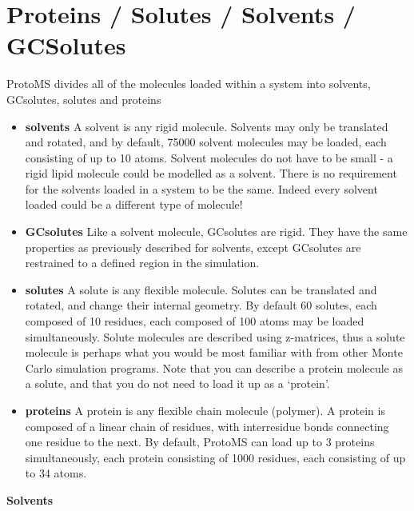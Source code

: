 \documentclass[letterpaper,10pt,english]{sphinxmanual}
\begin{document}
\section{Proteins / Solutes / Solvents / GCSolutes}
\label{protoms:proteins-solutes-solvents-gcsolutes}
ProtoMS divides all of the molecules loaded within a system into solvents, GCsolutes, solutes and proteins
\begin{itemize}
\item {} 
\textbf{solvents}  A solvent is any rigid molecule. Solvents may only be translated and rotated, and by default, 75000 solvent molecules may be loaded, each consisting of up to 10 atoms. Solvent molecules do not have to be small - a rigid lipid molecule could be modelled as a solvent. There is no requirement for the solvents loaded in a system to be the same. Indeed every solvent loaded could be a different type of molecule!

\item {} 
\textbf{GCsolutes} Like a solvent molecule, GCsolutes are rigid. They have the same properties as previously described for solvents, except GCsolutes are restrained to a defined region in the simulation.

\item {} 
\textbf{solutes} A solute is any flexible molecule. Solutes can be translated and rotated, and change their internal geometry. By default 60 solutes, each composed of 10 residues, each composed of 100 atoms may be loaded simultaneously. Solute molecules are described using z-matrices, thus a solute molecule is perhaps what you would be most familiar with from other Monte Carlo simulation programs. Note that you can describe a protein molecule as a solute, and that you do not need to load it up as a ‘protein’.

\item {} 
\textbf{proteins} A protein is any flexible chain molecule (polymer). A protein is composed of a linear chain of residues, with interresidue bonds connecting one residue to the next. By default, ProtoMS can load up to 3 proteins simultaneously, each protein consisting of 1000 residues, each consisting of up to 34 atoms.

\end{itemize}

\textbf{Solvents}
\end{document}
